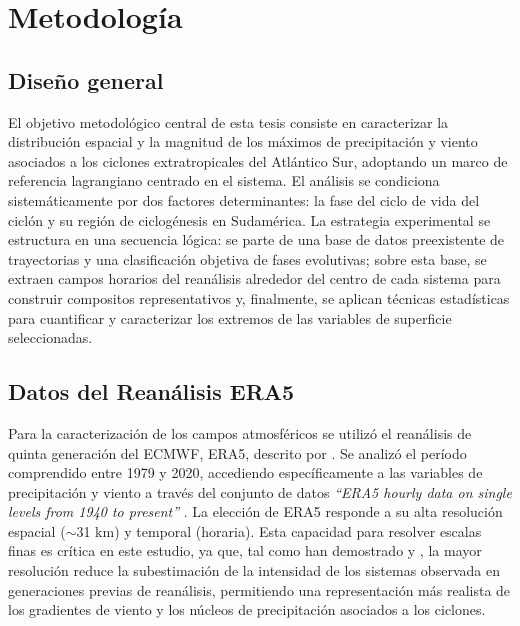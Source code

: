 \chapter{Metodología}\label{ch:metodologia}


\section{Diseño general}\label{sec:diseno_general}

El objetivo metodológico central de esta tesis consiste en caracterizar la distribución espacial y la magnitud de los máximos de precipitación y viento asociados a los ciclones extratropicales del Atlántico Sur, adoptando un marco de referencia lagrangiano centrado en el sistema. El análisis se condiciona sistemáticamente por dos factores determinantes: la fase del ciclo de vida del ciclón y su región de ciclogénesis en Sudamérica. La estrategia experimental se estructura en una secuencia lógica: se parte de una base de datos preexistente de trayectorias y una clasificación objetiva de fases evolutivas; sobre esta base, se extraen campos horarios del reanálisis alrededor del centro de cada sistema para construir compositos representativos y, finalmente, se aplican técnicas estadísticas para cuantificar y caracterizar los extremos de las variables de superficie seleccionadas.


\section{Datos del Reanálisis ERA5}\label{sec:datos_era5}
Para la caracterización de los campos atmosféricos se utilizó el reanálisis de quinta generación del ECMWF, ERA5, descrito por \citet{hersbach2020era5}. Se analizó el período comprendido entre 1979 y 2020, accediendo específicamente a las variables de precipitación y viento a través del conjunto de datos \textit{``ERA5 hourly data on single levels from 1940 to present''} \citep{hersbach_era5_2023b}. La elección de ERA5 responde a su alta resolución espacial ($\sim$31 km) y temporal (horaria). Esta capacidad para resolver escalas finas es crítica en este estudio, ya que, tal como han demostrado \citet{priestley2022improved} y \citet{dalanhese2023new}, la mayor resolución reduce la subestimación de la intensidad de los sistemas observada en generaciones previas de reanálisis, permitiendo una representación más realista de los gradientes de viento y los núcleos de precipitación asociados a los ciclones.
